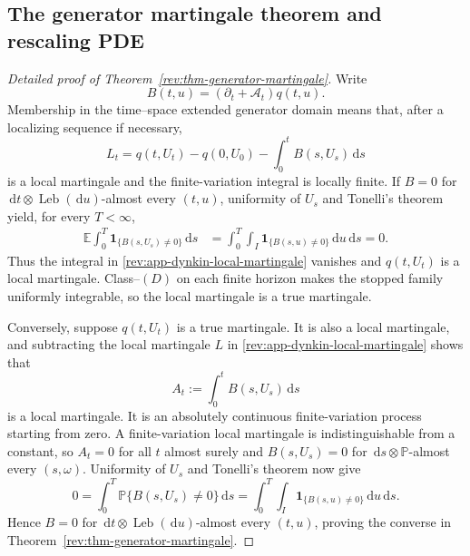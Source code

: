 \documentclass[11pt]{article}
\theoremstyle{remark}
\newcommand{\E}{\mathbb E}
\newcommand{\Pp}{\mathbb P}
\newcommand{\dd}{\,\mathrm d}
\newcommand{\one}{\mathbf 1}
\newcommand{\Leb}{\operatorname{Leb}}
\begin{document}
\subsection{The generator martingale theorem and rescaling PDE}
\label{rev:app-generator-martingale-proof}

\begin{proof}[Detailed proof of Theorem~\ref{rev:thm-generator-martingale}]
Write
\[
B(t,u)=(\partial_t+\mathcal A_t)q(t,u).
\]
Membership in the time--space extended generator domain means that, after a
localizing sequence if necessary,
\begin{equation}
L_t=q(t,U_t)-q(0,U_0)-\int_0^tB(s,U_s)\dd s
\label{rev:app-dynkin-local-martingale}
\end{equation}
is a local martingale and the finite-variation integral is locally finite.
If $B=0$ for $\dd t\otimes\Leb(\dd u)$-almost every $(t,u)$, uniformity of
$U_s$ and Tonelli's theorem yield, for every $T<\infty$,
\begin{align*}
\E\int_0^T\one_{\{B(s,U_s)\ne0\}}\dd s
&=\int_0^T\int_I\one_{\{B(s,u)\ne0\}}\dd u\dd s=0.
\end{align*}
Thus the integral in \eqref{rev:app-dynkin-local-martingale} vanishes and
$q(t,U_t)$ is a local martingale.  Class--$(D)$ on each finite horizon makes
the stopped family uniformly integrable, so the local martingale is a true
martingale.

Conversely, suppose $q(t,U_t)$ is a true martingale.  It is also a local
martingale, and subtracting the local martingale $L$ in
\eqref{rev:app-dynkin-local-martingale} shows that
\[
A_t:=\int_0^tB(s,U_s)\dd s
\]
is a local martingale.  It is an absolutely continuous finite-variation
process starting from zero.  A finite-variation local martingale is
indistinguishable from a constant, so $A_t=0$ for all $t$ almost surely and
$B(s,U_s)=0$ for $\dd s\otimes\Pp$-almost every $(s,\omega)$.  Uniformity of
$U_s$ and Tonelli's theorem now give
\[
0=\int_0^T\Pp\{B(s,U_s)\ne0\}\dd s
=\int_0^T\int_I\one_{\{B(s,u)\ne0\}}\dd u\dd s.
\]
Hence $B=0$ for $\dd t\otimes\Leb(\dd u)$-almost every $(t,u)$, proving the
converse in Theorem~\ref{rev:thm-generator-martingale}.
\end{proof}
\end{document}
